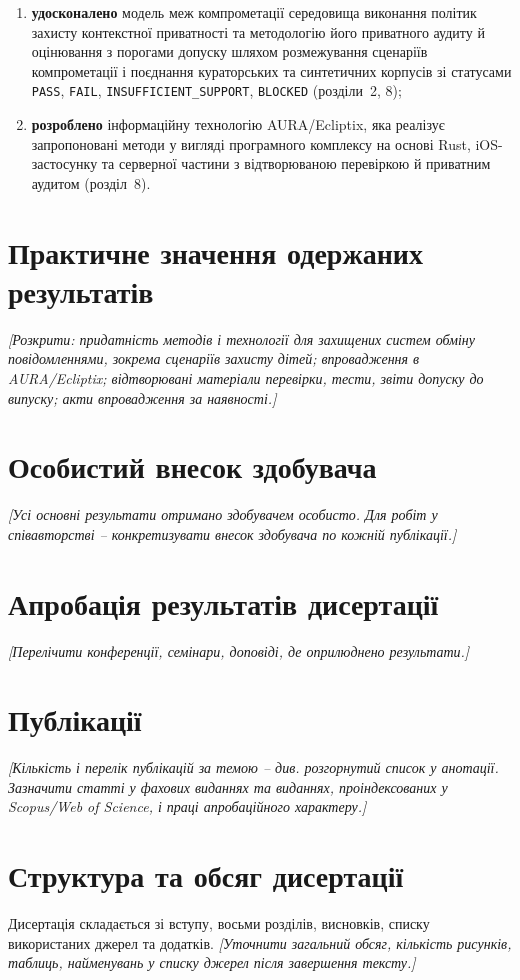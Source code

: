 \begin{enumerate}
  \item \textbf{удосконалено} модель меж компрометації середовища виконання політик захисту контекстної приватності та методологію його приватного аудиту й оцінювання з порогами допуску шляхом розмежування сценаріїв компрометації і поєднання кураторських та синтетичних корпусів зі статусами \texttt{PASS}, \texttt{FAIL}, \texttt{INSUFFICIENT\_SUPPORT}, \texttt{BLOCKED} (розділи~2, 8);

  \item \textbf{розроблено} інформаційну технологію AURA/Ecliptix, яка реалізує запропоновані методи у вигляді програмного комплексу на основі Rust, iOS-застосунку та серверної частини з відтворюваною перевіркою й приватним аудитом (розділ~8).
\end{enumerate}

\section*{Практичне значення одержаних результатів}

\emph{[Розкрити: придатність методів і технології для захищених систем обміну повідомленнями, зокрема сценаріїв захисту дітей; впровадження в AURA/Ecliptix; відтворювані матеріали перевірки, тести, звіти допуску до випуску; акти впровадження за наявності.]}

\section*{Особистий внесок здобувача}

\emph{[Усі основні результати отримано здобувачем особисто. Для робіт у співавторстві -- конкретизувати внесок здобувача по кожній публікації.]}

\section*{Апробація результатів дисертації}

\emph{[Перелічити конференції, семінари, доповіді, де оприлюднено результати.]}

\section*{Публікації}

\emph{[Кількість і перелік публікацій за темою -- див. розгорнутий список у анотації. Зазначити статті у фахових виданнях та виданнях, проіндексованих у Scopus/Web of Science, і праці апробаційного характеру.]}

\section*{Структура та обсяг дисертації}

Дисертація складається зі вступу, восьми розділів, висновків, списку використаних джерел та додатків. \emph{[Уточнити загальний обсяг, кількість рисунків, таблиць, найменувань у списку джерел після завершення тексту.]}
